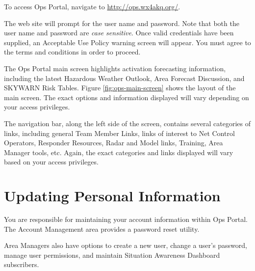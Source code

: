 \documentclass[pdflatex,letterpaper,twoside,12pt]{book}
\begin{document}
To access Ops Portal, navigate to \href{http://ops.wx4akq.org/}{http://ops.wx4akq.org/}.

The web site will prompt for the user name and password.  Note that both the user name and password are \emph{case sensitive}.  Once valid credentials have been supplied, an Acceptable Use Policy warning screen will appear.  You must agree to the terms and conditions in order to proceed.


The Ops Portal main screen highlights activation forecasting information, including the latest Hazardous Weather Outlook, Area Forecast Discussion, and SKYWARN Risk Tables.  Figure \ref{fig:ops-main-screen} shows the layout of the main screen.  The exact options and information displayed will vary depending on your access privileges.

The navigation bar, along the left side of the screen, contains several categories of links, including general Team Member Links, links of interest to Net Control Operators, Responder Resources, Radar and Model links, Training, Area Manager tools, etc.  Again, the exact categories and links displayed will vary based on your access privileges.


\section{Updating Personal Information}\label{profile-update}

You are responsible for maintaining your account information within Ops Portal.  The Account Management area provides a password reset utility.

Area Managers also have options to create a new user, change a user's password, manage user permissions, and maintain Situation Awareness Dashboard subscribers.

\end{document}

